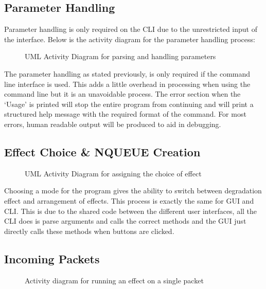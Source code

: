 \subsection{Parameter Handling}
Parameter handling is only required on the CLI due to the unrestricted input of the interface. Below is the activity diagram for the parameter handling process:

\begin{center}
	
	\begin{figure}[h]
		\caption{UML Activity Diagram for parsing and handling parameters}
	\end{figure}	
\end{center}

The parameter handling as stated previously, is only required if the command line interface is used. This adds a little overhead in processing when using the command line but it is an unavoidable process. The error section when the `Usage' is printed will stop the entire program from continuing and will print a structured help message with the required format of the command. For most errors, human readable output will be produced to aid in debugging.

\subsection{Effect Choice \& NQUEUE Creation}

\begin{center}
	
	\begin{figure}[h]
		\caption{UML Activity Diagram for assigning the choice of effect}
	\end{figure}
\end{center}


Choosing a mode for the program gives the ability to switch between degradation effect and arrangement of effects. This process is exactly the same for GUI and CLI. This is due to the shared code between the different user interfaces, all the CLI does is parse arguments and calls the correct methods and the GUI just directly calls these methods when buttons are clicked.

\subsection{Incoming Packets}
\begin{center}
	
	\begin{figure}[h]
		\caption{Activity diagram for running an effect on a single packet}
		\label{ref:incommingAD}
	\end{figure}
\end{center}

